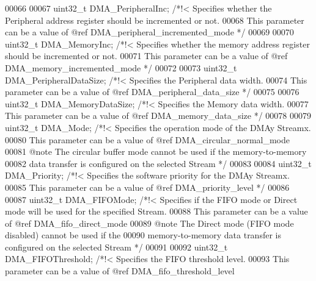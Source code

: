 \begin{DoxyCode}
00066 
00067   uint32\_t DMA_PeripheralInc;      \textcolor{comment}{/*!< Specifies whether the Peripheral address register should be
       incremented or not.}
00068 \textcolor{comment}{                                        This parameter can be a value of @ref
       DMA\_peripheral\_incremented\_mode */}
00069 
00070   uint32\_t DMA_MemoryInc;          \textcolor{comment}{/*!< Specifies whether the memory address register should be
       incremented or not.}
00071 \textcolor{comment}{                                        This parameter can be a value of @ref
       DMA\_memory\_incremented\_mode */}
00072 
00073   uint32\_t DMA_PeripheralDataSize; \textcolor{comment}{/*!< Specifies the Peripheral data width.}
00074 \textcolor{comment}{                                        This parameter can be a value of @ref DMA\_peripheral\_data\_size
       */}
00075 
00076   uint32\_t DMA_MemoryDataSize;     \textcolor{comment}{/*!< Specifies the Memory data width.}
00077 \textcolor{comment}{                                        This parameter can be a value of @ref DMA\_memory\_data\_size */}
00078 
00079   uint32\_t DMA_Mode;               \textcolor{comment}{/*!< Specifies the operation mode of the DMAy Streamx.}
00080 \textcolor{comment}{                                        This parameter can be a value of @ref DMA\_circular\_normal\_mode}
00081 \textcolor{comment}{                                        @note The circular buffer mode cannot be used if the
       memory-to-memory}
00082 \textcolor{comment}{                                              data transfer is configured on the selected Stream */}
00083 
00084   uint32\_t DMA_Priority;           \textcolor{comment}{/*!< Specifies the software priority for the DMAy Streamx.}
00085 \textcolor{comment}{                                        This parameter can be a value of @ref DMA\_priority\_level */}
00086 
00087   uint32\_t DMA_FIFOMode;          \textcolor{comment}{/*!< Specifies if the FIFO mode or Direct mode will be used for the
       specified Stream.}
00088 \textcolor{comment}{                                        This parameter can be a value of @ref DMA\_fifo\_direct\_mode}
00089 \textcolor{comment}{                                        @note The Direct mode (FIFO mode disabled) cannot be used if
       the }
00090 \textcolor{comment}{                                               memory-to-memory data transfer is configured on the
       selected Stream */}
00091 
00092   uint32\_t DMA_FIFOThreshold;      \textcolor{comment}{/*!< Specifies the FIFO threshold level.}
00093 \textcolor{comment}{                                        This parameter can be a value of @ref DMA\_fifo\_threshold\_level
}
\end{DoxyCode}
